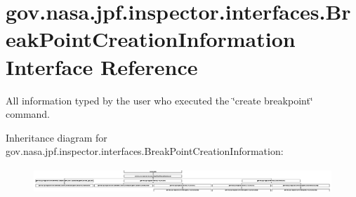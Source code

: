 \hypertarget{interfacegov_1_1nasa_1_1jpf_1_1inspector_1_1interfaces_1_1_break_point_creation_information}{}\section{gov.\+nasa.\+jpf.\+inspector.\+interfaces.\+Break\+Point\+Creation\+Information Interface Reference}
\label{interfacegov_1_1nasa_1_1jpf_1_1inspector_1_1interfaces_1_1_break_point_creation_information}


All information typed by the user who executed the \char`\"{}create breakpoint\char`\"{} command.  


Inheritance diagram for gov.\+nasa.\+jpf.\+inspector.\+interfaces.\+Break\+Point\+Creation\+Information\+:\begin{figure}[H]
\begin{center}
\leavevmode
\includegraphics[height=0.949153cm]{interfacegov_1_1nasa_1_1jpf_1_1inspector_1_1interfaces_1_1_break_point_creation_information}
\end{center}
\end{figure}
